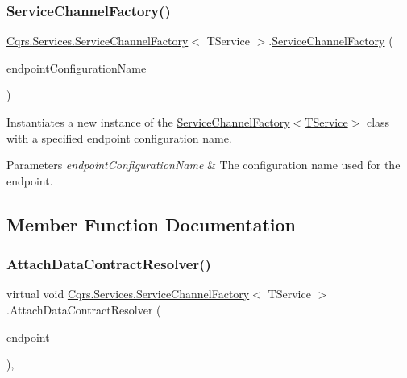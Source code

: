 \subsubsection{\texorpdfstring{Service\+Channel\+Factory()}{ServiceChannelFactory()}}
{\footnotesize\ttfamily \hyperlink{classCqrs_1_1Services_1_1ServiceChannelFactory}{Cqrs.\+Services.\+Service\+Channel\+Factory}$<$ T\+Service $>$.\hyperlink{classCqrs_1_1Services_1_1ServiceChannelFactory}{Service\+Channel\+Factory} (\begin{DoxyParamCaption}\item[{string}]{endpoint\+Configuration\+Name }\end{DoxyParamCaption})}



Instantiates a new instance of the \hyperlink{classCqrs_1_1Services_1_1ServiceChannelFactory_a8b483162bcc271fa8212c72e13e28f55_a8b483162bcc271fa8212c72e13e28f55}{Service\+Channel\+Factory$<$\+T\+Service$>$} class with a specified endpoint configuration name. 


\begin{DoxyParams}{Parameters}
{\em endpoint\+Configuration\+Name} & The configuration name used for the endpoint.\\
\hline
\end{DoxyParams}


\subsection{Member Function Documentation}
\mbox{\label{classCqrs_1_1Services_1_1ServiceChannelFactory_a90572d83f68b4ba72687bb8c755b0845_a90572d83f68b4ba72687bb8c755b0845}} 
\subsubsection{\texorpdfstring{Attach\+Data\+Contract\+Resolver()}{AttachDataContractResolver()}}
{\footnotesize\ttfamily virtual void \hyperlink{classCqrs_1_1Services_1_1ServiceChannelFactory}{Cqrs.\+Services.\+Service\+Channel\+Factory}$<$ T\+Service $>$.Attach\+Data\+Contract\+Resolver (\begin{DoxyParamCaption}\item[{Service\+Endpoint}]{endpoint }\end{DoxyParamCaption})\hspace{0.3cm}{\ttfamily [protected]}, {\ttfamily [virtual]}}



